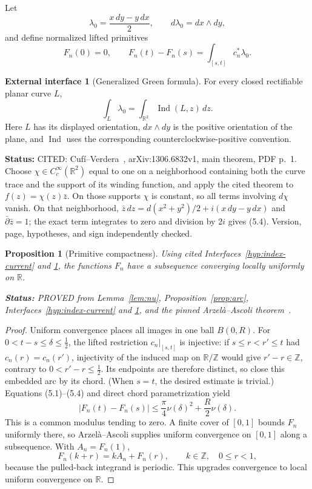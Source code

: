 \documentclass[11pt]{article}
\newtheorem{proposition}[theorem]{Proposition}
\theoremstyle{definition}
\newtheorem{hypothesis}[theorem]{External interface}
\theoremstyle{remark}
\newcommand{\R}{\mathbb R}
\newcommand{\Ind}{\operatorname{Ind}}
\newcommand{\status}[1]{\par\smallskip\noindent\textbf{Status:}
  \begingroup\small\sffamily #1.\endgroup\par\smallskip}
\begin{document}
Let
\[
 \lambda_0=\frac{x\,dy-y\,dx}{2},\qquad d\lambda_0=dx\wedge dy,
\]
and define normalized lifted primitives
\[
 F_n(0)=0,
 \qquad F_n(t)-F_n(s)=\int_{[s,t]}c_n^*\lambda_0.         \tag{5.3}
\]

\begin{hypothesis}[Generalized Green formula]\label{hyp:green}
For every closed rectifiable planar curve $L$,
\[
 \int_L\lambda_0=\int_{\R^2}\Ind(L,z)\,dz.              \tag{5.4}
\]
Here $L$ has its displayed orientation, $dx\wedge dy$ is the positive
orientation of the plane, and $\Ind$ uses the corresponding
counterclockwise-positive convention.
\status{CITED: Cuf\'i--Verdera~\cite{CV}, arXiv:1306.6832v1, main theorem, PDF p.~1.
Choose $\chi\in C_c^\infty(\R^2)$ equal to one on a neighborhood containing
both the curve trace and the support of its winding function, and apply the
cited theorem to $f(z)=\chi(z)\bar z$.  On those supports $\chi$ is constant,
so all terms involving $d\chi$ vanish.  On that neighborhood,
$\bar z\,dz=d(x^2+y^2)/2+i(x\,dy-y\,dx)$ and
$\bar\partial\bar z=1$; the exact term integrates to zero and division by
$2i$ gives (5.4).  Version, page, hypotheses, and sign independently checked}
\end{hypothesis}

\begin{proposition}[Primitive compactness]\label{prop:primitive}
Using cited Interfaces~\ref{hyp:index-current} and \ref{hyp:green}, the functions
$F_n$ have a subsequence
converging locally uniformly on $\R$.
\status{PROVED from Lemma~\ref{lem:nu},
Proposition~\ref{prop:arc}, Interfaces~\ref{hyp:index-current} and
\ref{hyp:green}, and the pinned Arzel\`a--Ascoli theorem~\cite{Rudin}}
\end{proposition}

\begin{proof}
Uniform convergence places all images in one ball $B(0,R)$.  For
$0<t-s\leq\delta\leq\tfrac12$, the lifted restriction
$c_n|_{[s,t]}$ is injective: if $s\leq r<r'\leq t$ had
$c_n(r)=c_n(r')$, injectivity of the induced map on $\R/\mathbb Z$ would give
$r'-r\in\mathbb Z$, contrary to $0<r'-r\leq\tfrac12$.  Its endpoints are therefore
distinct, so close this embedded arc by its chord.  (When $s=t$, the desired
estimate is trivial.)  Equations
(5.1)--(5.4) and direct chord parametrization yield
\[
 |F_n(t)-F_n(s)|
 \leq \frac\pi4\nu(\delta)^2+\frac R2\nu(\delta).       \tag{5.5}
\]
This is a common modulus tending to zero.  A finite cover of $[0,1]$
bounds $F_n$ uniformly there, so Arzel\`a--Ascoli supplies uniform
convergence on $[0,1]$ along a subsequence.  With $A_n=F_n(1)$,
\[
 F_n(k+r)=kA_n+F_n(r),\qquad k\in\mathbb Z,\quad0\leq r<1,
\]
because the pulled-back integrand is periodic.  This upgrades convergence
to local uniform convergence on $\R$.
\end{proof}
\end{document}
